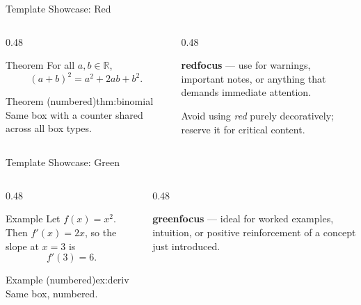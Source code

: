 \redheader
\begin{frame}{Template Showcase: Red}
\begin{columns}[T]
  \begin{column}{0.48\textwidth}
    \begin{redbox*}{Theorem}
      For all $a, b \in \mathbb{R}$,
      \[
        (a + b)^2 = a^2 + 2ab + b^2.
      \]
    \end{redbox*}
    \medskip
    \begin{redbox}{Theorem (numbered)}{thm:binomial}
      Same box with a counter shared across all box types.
    \end{redbox}
  \end{column}
  \begin{column}{0.48\textwidth}
    \begin{redfocus}
      \textbf{redfocus} --- use for warnings, important notes, or anything that demands immediate attention.

      \medskip
      Avoid using \emph{red} purely decoratively; reserve it for critical content.
    \end{redfocus}
  \end{column}
\end{columns}
\end{frame}

\greenheader
\begin{frame}{Template Showcase: Green}
\begin{columns}[T]
  \begin{column}{0.48\textwidth}
    \begin{greenbox*}{Example}
      Let $f(x) = x^2$. Then $f'(x) = 2x$, so the slope at $x = 3$ is
      \[
        f'(3) = 6.
      \]
    \end{greenbox*}
    \medskip
    \begin{greenbox}{Example (numbered)}{ex:deriv}
      Same box, numbered.
    \end{greenbox}
  \end{column}
  \begin{column}{0.48\textwidth}
    \begin{greenfocus}
      \textbf{greenfocus} --- ideal for worked examples, intuition, or positive reinforcement of a concept just introduced.
    \end{greenfocus}
  \end{column}
\end{columns}
\end{frame}

